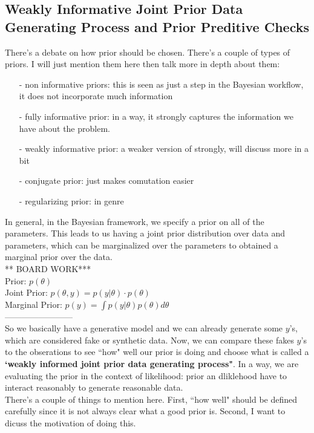 \documentclass[]{article}
\begin{document}
\subsection*{Weakly Informative Joint Prior Data Generating Process and Prior Preditive Checks}
There's a debate on how prior should be chosen. There's a couple of types of priors. I will just mention them here then talk more in depth about them: 

\begin{itemize}
\item[-] non informative priors: this is seen as just a step in the Bayesian workflow, it does not incorporate much information
\item[-] fully informative prior: in a way, it strongly captures the information we have about the problem.
\item[-] weakly informative  prior: a weaker version of strongly, will discuss more in a bit
\item[-] conjugate prior: just makes comutation easier
\item[-] regularizing prior: in genre
\end{itemize}

\noindent In general, in the Bayesian framework, we specify a prior on all of the parameters. This leads to us having a joint prior distribution over data and parameters, which can be marginalized over the parameters to obtained a marginal prior over the data. \\

\noindent*** BOARD WORK*** \\
Prior: $ p(\theta)$ \\
Joint Prior: $p(\theta, y) = p(y | \theta) \cdot p(\theta)$ \\
Marginal Prior: $p(y) = \int p(y|\theta) p(\theta) d\theta$\\
------------------------\\
So we basically have a generative model and we can already generate some $y$'s, which are considered fake or synthetic data. Now, we can compare these fakes $y$'s to the obserations to see ``how" well our prior is doing and choose what is called a \textbf{`weakly informed joint prior data generating process"}. In a way, we are evaluating the prior in the context of likelihood: prior an dliklehood have to interact reasonably to generate reasonable data. \\There's a couple of things to mention here. First, ``how well" should be defined carefully since it is not always clear what a good prior is. Second, I want to dicuss the motivation of doing this. \\ 
\end{document}
